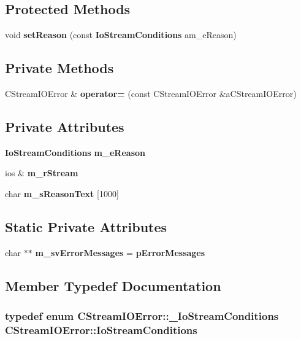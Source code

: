 \subsection*{Protected Methods}
\begin{CompactItemize}
\item 
void {\bf set\-Reason} (const {\bf Io\-Stream\-Conditions} am\_\-e\-Reason)
\end{CompactItemize}
\subsection*{Private Methods}
\begin{CompactItemize}
\item 
CStream\-IOError \& {\bf operator=} (const CStream\-IOError \&a\-CStream\-IOError)
\end{CompactItemize}
\subsection*{Private Attributes}
\begin{CompactItemize}
\item 
{\bf Io\-Stream\-Conditions} {\bf m\_\-e\-Reason}
\item 
ios \& {\bf m\_\-r\-Stream}
\item 
char {\bf m\_\-s\-Reason\-Text} [1000]
\end{CompactItemize}
\subsection*{Static Private Attributes}
\begin{CompactItemize}
\item 
char $\ast$$\ast$ {\bf m\_\-sv\-Error\-Messages} = {\bf p\-Error\-Messages}
\end{CompactItemize}


\subsection{Member Typedef Documentation}
\subsubsection{\setlength{\rightskip}{0pt plus 5cm}typedef enum {\bf CStream\-IOError::\_\-Io\-Stream\-Conditions}  CStream\-IOError::Io\-Stream\-Conditions}\label{classCStreamIOError_s0}




